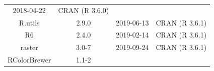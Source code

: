 \documentclass[11pt,]{book}
\begin{document}
\begin{longtable}[]{@{}cccc@{}}
\begin{minipage}[t]{0.16\columnwidth}
2018-04-22\strut
\end{minipage} & \begin{minipage}[t]{0.36\columnwidth}\centering\strut
CRAN (R 3.6.0)\strut
\end{minipage}\tabularnewline
\begin{minipage}[t]{0.18\columnwidth}\centering\strut
R.utils\strut
\end{minipage} & \begin{minipage}[t]{0.19\columnwidth}\centering\strut
2.9.0\strut
\end{minipage} & \begin{minipage}[t]{0.16\columnwidth}\centering\strut
2019-06-13\strut
\end{minipage} & \begin{minipage}[t]{0.36\columnwidth}\centering\strut
CRAN (R 3.6.1)\strut
\end{minipage}\tabularnewline
\begin{minipage}[t]{0.18\columnwidth}\centering\strut
R6\strut
\end{minipage} & \begin{minipage}[t]{0.19\columnwidth}\centering\strut
2.4.0\strut
\end{minipage} & \begin{minipage}[t]{0.16\columnwidth}\centering\strut
2019-02-14\strut
\end{minipage} & \begin{minipage}[t]{0.36\columnwidth}\centering\strut
CRAN (R 3.6.1)\strut
\end{minipage}\tabularnewline
\begin{minipage}[t]{0.18\columnwidth}\centering\strut
raster\strut
\end{minipage} & \begin{minipage}[t]{0.19\columnwidth}\centering\strut
3.0-7\strut
\end{minipage} & \begin{minipage}[t]{0.16\columnwidth}\centering\strut
2019-09-24\strut
\end{minipage} & \begin{minipage}[t]{0.36\columnwidth}\centering\strut
CRAN (R 3.6.1)\strut
\end{minipage}\tabularnewline
\begin{minipage}[t]{0.18\columnwidth}\centering\strut
RColorBrewer\strut
\end{minipage} & \begin{minipage}[t]{0.19\columnwidth}\centering\strut
1.1-2\strut
\end{minipage} & \begin{minipage}[t]{0.16\columnwidth}\centering\strut

\end{minipage}
\end{longtable}
\end{document}
